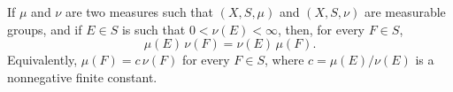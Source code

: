 If $\mu$ and $\nu$ are two measures such that $(X, S, \mu)$ and $(X, S, \nu)$ are measurable groups, and if $E \in S$ is such that $0 < \nu(E) < \infty$, then, for every $F \in S$,
$$
\mu(E)\,\nu(F) = \nu(E)\,\mu(F).
$$
Equivalently, $\mu(F) = c\,\nu(F)$ for every $F \in S$, where $c = \mu(E)/\nu(E)$ is a nonnegative finite constant.
